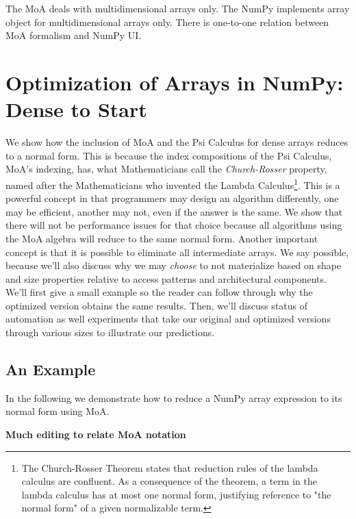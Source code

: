 \documentclass[a4paper,12pt]{article}
\begin{document}
The MoA deals with multidimensional arrays only.  The NumPy implements
array object for multidimensional arrays only. There is one-to-one
relation between MoA formalism and NumPy UI.

\section{Optimization of Arrays in NumPy: Dense to Start}
We show how the inclusion of MoA and the Psi Calculus for dense arrays
reduces to a normal form. This is because the index compositions of the Psi Calculus, MoA's indexing, has, what Mathematicians call the {\em Church-Rosser} property, named after the Mathematicians who invented the Lambda  Calculus\footnote{The Church-Rosser Theorem states that reduction rules of the lambda calculus are confluent. As a consequence of the theorem, a term in the lambda calculus has at most one normal form, justifying reference to "the normal form" of a given normalizable term.}. This is a powerful concept in that programmers may design an algorithm differently, one may be efficient, another may not, even if the answer is the same. 
\noindent
We show that there will not be performance issues for that choice because all algorithms using the MoA algebra will reduce to the same normal form. Another important concept is that it is possible to eliminate all intermediate arrays. We say possible, because we'll also discuss why we may {\em choose} to not materialize based on shape and size properties relative to access patterns and architectural components. 
We'll first give a small example so the reader can follow through why the optimized version obtains the same results. Then, we'll discuss status of automation as well experiments that take our original and optimized versions through various sizes to illustrate our predictions.


\subsection{An Example}

In the following we demonstrate how to reduce a NumPy array expression
to its normal form using MoA.

{\bf Much editing to relate MoA notation}
\end{document}
